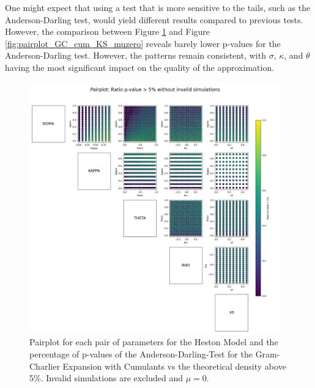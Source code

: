 One might expect that using a test that is more sensitive to the tails, such as the Anderson-Darling test, would yield different results compared to previous tests. However, the comparison between Figure \ref{fig:pairplot_GC_cum_AD_muzero} and Figure \ref{fig:pairplot_GC_cum_KS_muzero} reveals barely lower p-values for the Anderson-Darling test. However, the patterns remain consistent, with $\sigma$, $\kappa$, and $\theta$ having the most significant impact on the quality of the approximation.

\begin{figure}
    \centering
    \includegraphics[width=0.97\textwidth]{img/pairplot_GC_cum_AD_muzero.png}
    \caption{Pairplot for each pair of parameters for the Heston Model and the percentage of p-values of the Anderson-Darling-Test for the Gram-Charlier Expansion with Cumulants vs the theoretical density above 5\%. Invalid simulations are excluded and $\mu=0$.}
    \label{fig:pairplot_GC_cum_AD_muzero}
\end{figure}